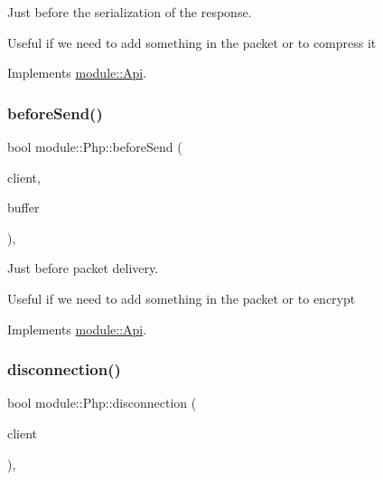 Just before the serialization of the response. 

Useful if we need to add something in the packet or to compress it 

Implements \hyperlink{structmodule_1_1Api_a5293babe6b28a397b7a11f32da0a6f51}{module\+::\+Api}.

\mbox{\label{classmodule_1_1Php_a9ba9768f149e9dbf3094d5cdb4967fc3}} 
\subsubsection{\texorpdfstring{before\+Send()}{beforeSend()}}
{\footnotesize\ttfamily bool module\+::\+Php\+::before\+Send (\begin{DoxyParamCaption}\item[{const \hyperlink{structnet_1_1IClient}{net\+::\+I\+Client} \&}]{client,  }\item[{std\+::string \&}]{buffer }\end{DoxyParamCaption})\hspace{0.3cm}{\ttfamily [virtual]}, {\ttfamily [noexcept]}}



Just before packet delivery. 

Useful if we need to add something in the packet or to encrypt 

Implements \hyperlink{structmodule_1_1Api_a71d1ada8bc5fc81fd71607315dd86185}{module\+::\+Api}.

\mbox{\label{classmodule_1_1Php_af828a98b73d3da6a53a64d4b3b3927c4}} 
\subsubsection{\texorpdfstring{disconnection()}{disconnection()}}
{\footnotesize\ttfamily bool module\+::\+Php\+::disconnection (\begin{DoxyParamCaption}\item[{const \hyperlink{structnet_1_1IClient}{net\+::\+I\+Client} \&}]{client }\end{DoxyParamCaption})\hspace{0.3cm}{\ttfamily [virtual]}, {\ttfamily [noexcept]}}



